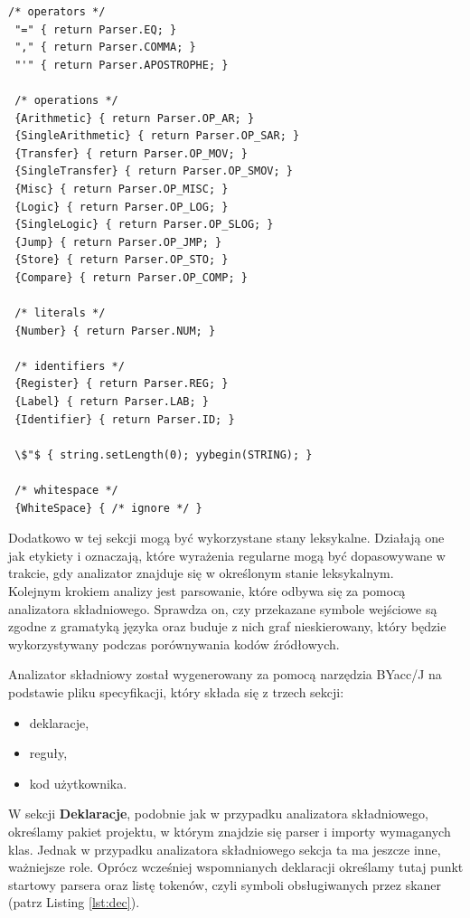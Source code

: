 \documentclass[a4paper,12pt,twoside]{article}
\begin{document}
\begin{lstlisting}[mathescape, caption={Lista reguł leksykalnych w programie CodeComp.}, label={lst:reguly}]
 /* operators */
 "=" { return Parser.EQ; }
 "," { return Parser.COMMA; }
 "'" { return Parser.APOSTROPHE; }
 
 /* operations */
 {Arithmetic} { return Parser.OP_AR; }
 {SingleArithmetic} { return Parser.OP_SAR; }
 {Transfer} { return Parser.OP_MOV; }
 {SingleTransfer} { return Parser.OP_SMOV; } 
 {Misc} { return Parser.OP_MISC; }
 {Logic} { return Parser.OP_LOG; }
 {SingleLogic} { return Parser.OP_SLOG; }
 {Jump} { return Parser.OP_JMP; }
 {Store} { return Parser.OP_STO; }
 {Compare} { return Parser.OP_COMP; }
 
 /* literals */
 {Number} { return Parser.NUM; }
 
 /* identifiers */
 {Register} { return Parser.REG; }
 {Label} { return Parser.LAB; }
 {Identifier} { return Parser.ID; }
 
 \$"$ { string.setLength(0); yybegin(STRING); }
 
 /* whitespace */ 
 {WhiteSpace} { /* ignore */ }
\end{lstlisting}

Dodatkowo w tej sekcji mogą być wykorzystane stany leksykalne. Działają one jak etykiety i oznaczają, które wyrażenia regularne mogą być dopasowywane w trakcie, gdy analizator znajduje się w określonym stanie leksykalnym.
\\

Kolejnym krokiem analizy jest parsowanie, które odbywa się za pomocą analizatora składniowego. Sprawdza on, czy przekazane symbole wejściowe są zgodne z gramatyką języka oraz buduje z nich graf nieskierowany, który będzie wykorzystywany podczas porównywania kodów źródłowych.

Analizator składniowy został wygenerowany za pomocą narzędzia BYacc/J\cite{byaccj} na podstawie pliku specyfikacji, który składa się z trzech sekcji:
\begin{itemize}
\item deklaracje,
\item reguły,
\item kod użytkownika.
\end{itemize}

W sekcji \textbf{Deklaracje}, podobnie jak w przypadku analizatora składniowego, określamy pakiet projektu, w którym znajdzie się parser i importy wymaganych klas. Jednak w przypadku analizatora składniowego sekcja ta ma jeszcze inne, ważniejsze role. Oprócz wcześniej wspomnianych deklaracji określamy tutaj punkt startowy parsera oraz listę tokenów, czyli symboli obsługiwanych przez skaner (patrz Listing \ref{lst:dec}).
\end{document}
